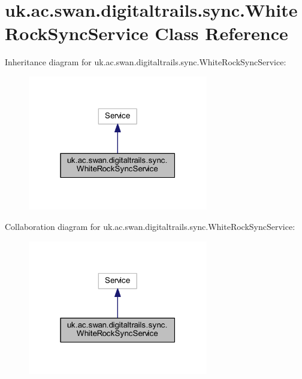 \hypertarget{classuk_1_1ac_1_1swan_1_1digitaltrails_1_1sync_1_1_white_rock_sync_service}{\section{uk.\+ac.\+swan.\+digitaltrails.\+sync.\+White\+Rock\+Sync\+Service Class Reference}
\label{classuk_1_1ac_1_1swan_1_1digitaltrails_1_1sync_1_1_white_rock_sync_service}
}


Inheritance diagram for uk.\+ac.\+swan.\+digitaltrails.\+sync.\+White\+Rock\+Sync\+Service\+:\nopagebreak
\begin{figure}[H]
\begin{center}
\leavevmode
\includegraphics[width=223pt]{classuk_1_1ac_1_1swan_1_1digitaltrails_1_1sync_1_1_white_rock_sync_service__inherit__graph}
\end{center}
\end{figure}


Collaboration diagram for uk.\+ac.\+swan.\+digitaltrails.\+sync.\+White\+Rock\+Sync\+Service\+:\nopagebreak
\begin{figure}[H]
\begin{center}
\leavevmode
\includegraphics[width=223pt]{classuk_1_1ac_1_1swan_1_1digitaltrails_1_1sync_1_1_white_rock_sync_service__coll__graph}
\end{center}
\end{figure}
